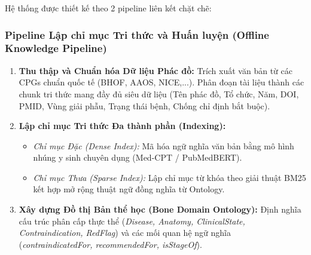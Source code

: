 \documentclass[12pt,a4paper]{article}
\begin{document}
Hệ thống được thiết kế theo 2 pipeline liên kết chặt chẽ:

\subsubsection{Pipeline Lập chỉ mục Tri thức và Huấn luyện (Offline Knowledge Pipeline)}
\begin{enumerate}[leftmargin=1.27cm, label=\arabic*.]
    \item \textbf{Thu thập và Chuẩn hóa Dữ liệu Phác đồ:} Trích xuất văn bản từ các CPGs chuẩn quốc tế (BHOF, AAOS, NICE,...). Phân đoạn tài liệu thành các chunk tri thức mang đầy đủ siêu dữ liệu (Tên phác đồ, Tổ chức, Năm, DOI, PMID, Vùng giải phẫu, Trạng thái bệnh, Chống chỉ định bắt buộc).
    \item \textbf{Lập chỉ mục Tri thức Đa thành phần (Indexing):}
    \begin{itemize}
        \item \textit{Chỉ mục Đặc (Dense Index):} Mã hóa ngữ nghĩa văn bản bằng mô hình nhúng y sinh chuyên dụng (Med-CPT / PubMedBERT).
        \item \textit{Chỉ mục Thưa (Sparse Index):} Lập chỉ mục từ khóa theo giải thuật BM25 kết hợp mở rộng thuật ngữ đồng nghĩa từ Ontology.
    \end{itemize}
    \item \textbf{Xây dựng Đồ thị Bản thể học (Bone Domain Ontology):} Định nghĩa cấu trúc phân cấp thực thể (\textit{Disease, Anatomy, ClinicalState, Contraindication, RedFlag}) và các mối quan hệ ngữ nghĩa (\textit{contraindicatedFor, recommendedFor, isStageOf}).
\end{enumerate}
\end{document}
